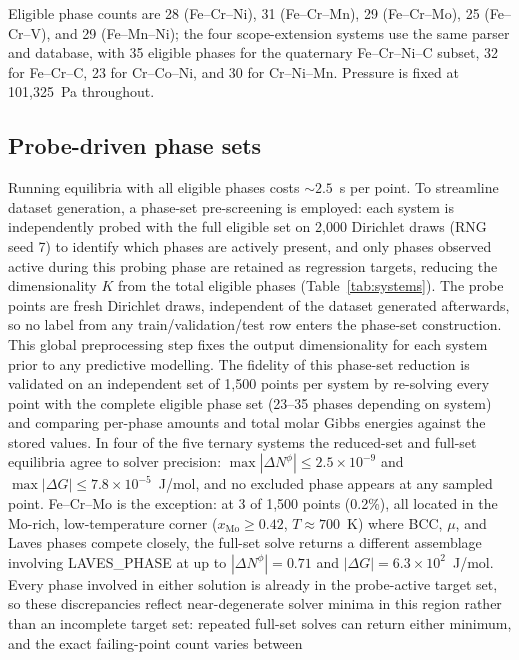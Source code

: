 \documentclass[preprint,12pt,authoryear]{elsarticle}
\newcommand{\Np}[1]{N^{#1}}
\begin{document}
Eligible phase counts are 28 (Fe--Cr--Ni), 31 (Fe--Cr--Mn), 29 (Fe--Cr--Mo),
25 (Fe--Cr--V), and 29 (Fe--Mn--Ni); the four scope-extension systems use
the same parser and database, with 35 eligible phases for the quaternary
Fe--Cr--Ni--C subset, 32 for Fe--Cr--C, 23 for Cr--Co--Ni, and 30 for
Cr--Ni--Mn. Pressure is fixed at 101{,}325~Pa
throughout.

\subsection{Probe-driven phase sets}

Running equilibria with all eligible phases costs ${\sim}2.5$~s per point.
To streamline dataset generation, a phase-set pre-screening is employed:
each system is independently probed with the full eligible set on 2{,}000
Dirichlet draws (RNG seed 7) to identify which phases are actively present,
and only phases observed active during this probing phase are retained as
regression targets, reducing the dimensionality $K$ from the total eligible
phases (Table~\ref{tab:systems}). The probe points are fresh Dirichlet
draws, independent of the dataset generated afterwards, so no label
from any train/validation/test row enters the phase-set construction. This
global preprocessing step fixes the output dimensionality for each system
prior to any predictive modelling. The fidelity of this phase-set reduction
is validated on an independent set of 1{,}500 points per system by
re-solving every point with the complete eligible phase set (23--35 phases
depending on system) and comparing per-phase amounts and total molar Gibbs
energies against the stored values. In four of the five ternary systems the
reduced-set and full-set equilibria agree to solver precision: $\max
|\Delta\Np{\phi}| \le 2.5\times10^{-9}$ and $\max |\Delta G| \le
7.8\times10^{-5}$~J/mol, and no excluded phase appears at any sampled
point. Fe--Cr--Mo is the exception: at 3 of 1{,}500 points (0.2\%), all
located in the Mo-rich, low-temperature corner ($x_{\mathrm{Mo}} \ge 0.42$,
$T \approx 700$~K) where BCC, $\mu$, and Laves phases compete closely, the
full-set solve returns a different assemblage involving LAVES\_PHASE at up
to $|\Delta\Np{\phi}| = 0.71$ and $|\Delta G| = 6.3\times10^{2}$~J/mol.
Every phase involved in either solution is already in the probe-active
target set, so these discrepancies reflect near-degenerate solver minima in
this region rather than an incomplete target set: repeated full-set solves
can return either minimum, and the exact failing-point count varies between
\end{document}
